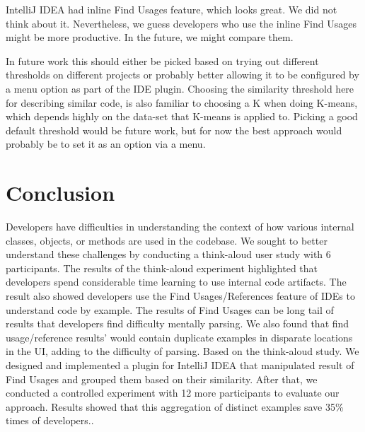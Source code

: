 \documentclass[conference]{IEEEtran}
\begin{document}
IntelliJ IDEA had inline Find Usages feature, which looks great. We did not think about it. Nevertheless, we guess developers who use the inline Find Usages might be more productive. In the future, we might compare them. \par

In future work this should either be picked based on trying out different thresholds on different projects or probably better allowing it to be configured by a menu option as part of the IDE plugin. Choosing the similarity threshold here for describing similar code, is also familiar to choosing a K when doing K-means, which depends highly on the data-set that K-means is applied to. Picking a good default threshold would be future work, but for now the best approach would probably be to set it as an option via a menu.

\section{Conclusion}
Developers have difficulties in understanding the context of how various internal classes, objects, or methods are used in the codebase. We sought to better understand these challenges by conducting a think-aloud user study with 6 participants. The results of the think-aloud experiment highlighted that developers spend considerable time learning to use internal code artifacts. The result also showed developers use the Find Usages/References feature of IDEs to understand code by example. The results of Find Usages can be long tail of results that developers find difficulty mentally parsing. We also found that find usage/reference results' would contain duplicate examples in disparate locations in the UI, adding to the difficulty of parsing. Based on the think-aloud study. We designed and implemented a plugin for IntelliJ IDEA that manipulated result of Find Usages and grouped them based on their similarity. After that, we conducted a controlled experiment with 12 more participants to evaluate our approach. Results showed that this aggregation of distinct examples save 35\% times of developers..





\end{document}
